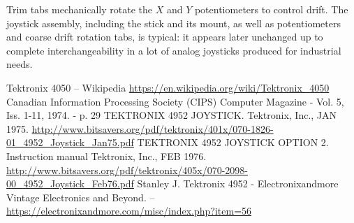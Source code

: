 \documentclass[11pt, a4paper]{article}
\begin{document}
Trim tabs mechanically rotate the $X$ and $Y$ potentiometers to control drift.
The joystick assembly, including the stick and its mount, as well as potentiometers and coarse drift rotation tabs, is typical: it appears later unchanged up to complete interchangeability in a lot of analog joysticks produced for industrial needs.


\begin{thebibliography}{9}
 Tektronix 4050 -- Wikipedia \url{https://en.wikipedia.org/wiki/Tektronix_4050}
 Canadian Information Processing Society (CIPS) Computer Magazine - Vol. 5, Iss. 1-11, 1974. - p. 29
 TEKTRONIX 4952 JOYSTICK. Tektronix, Inc., JAN 1975. \url{http://www.bitsavers.org/pdf/tektronix/401x/070-1826-01_4952_Joystick_Jan75.pdf}
 TEKTRONIX 4952 JOYSTICK OPTION 2. Instruction manual Tektronix, Inc., FEB 1976. \url{http://www.bitsavers.org/pdf/tektronix/405x/070-2098-00_4952_Joystick_Feb76.pdf}
 Stanley J. Tektronix 4952 - Electronixandmore Vintage Electronics and Beyond. -- \url{https://electronixandmore.com/misc/index.php?item=56}
\end{thebibliography}
\end{document}
